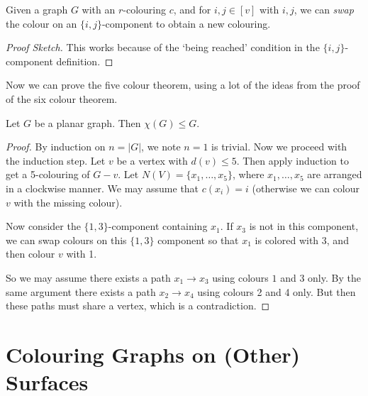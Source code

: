 \documentclass[a4paper]{scrreprt}
\begin{document}
\begin{proposition}
Given a graph $G$ with an $r$-colouring $c$, and for $i, j \in [v]$ with $i, j$, we can \emph{swap} the colour on an $\{i, j\}$-component to obtain a new colouring.	
\end{proposition}
\begin{proof}[Proof Sketch]
	This works because of the `being reached' condition in the $\{i, j\}$-component definition.
\end{proof}

Now we can prove the five colour theorem, using a lot of the ideas from the proof of the six colour theorem.

\begin{theorem}
	Let $G$ be a planar graph. Then $\chi(G) \leq G$.
\end{theorem}
\begin{proof}
	By induction on $n = |G|$, we note $n = 1$ is trivial.
	Now we proceed with the induction step. Let $v$ be a vertex with $d(v) \leq 5$. Then apply induction to get a 5-colouring of $G - v$. Let $N(V) = \{x_1, \dots, x_5\}$, where $x_1, \dots, x_5$ are arranged in a clockwise manner. We may assume that $c(x_i) = i$ (otherwise we can colour $v$ with the missing colour).

	Now consider the $\{1, 3\}$-component containing $x_1$. If $x_3$ is not in this component, we can swap colours on this $\{1, 3\}$ component so that $x_1$ is colored with $3$, and then colour $v$ with 1. 

	So we may assume there exists a path $x_1 \rightarrow x_3$ using colours $1$ and $3$ only. By the same argument there exists a path $x_2 \rightarrow x_4$ using colours 2 and 4 only. But then these paths must share a vertex, which is a contradiction.
\end{proof}

\section{Colouring Graphs on (Other) Surfaces}
\end{document}

